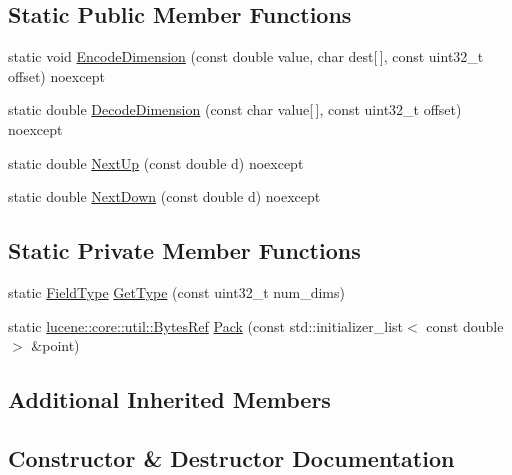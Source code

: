 \subsection*{Static Public Member Functions}
\begin{DoxyCompactItemize}
\item 
static void \mbox{\hyperlink{classlucene_1_1core_1_1document_1_1DoublePoint_a633e37e3ec07561f1af51e0215069cc5}{Encode\+Dimension}} (const double value, char dest\mbox{[}$\,$\mbox{]}, const uint32\+\_\+t offset) noexcept
\item 
static double \mbox{\hyperlink{classlucene_1_1core_1_1document_1_1DoublePoint_abffe80eb3bb0bf46daceaff952a669b9}{Decode\+Dimension}} (const char value\mbox{[}$\,$\mbox{]}, const uint32\+\_\+t offset) noexcept
\item 
static double \mbox{\hyperlink{classlucene_1_1core_1_1document_1_1DoublePoint_a1528aa543245510f6643c7432fcf3a9a}{Next\+Up}} (const double d) noexcept
\item 
static double \mbox{\hyperlink{classlucene_1_1core_1_1document_1_1DoublePoint_ad8b9a18e61d743166d762e2f82b2deb1}{Next\+Down}} (const double d) noexcept
\end{DoxyCompactItemize}
\subsection*{Static Private Member Functions}
\begin{DoxyCompactItemize}
\item 
static \mbox{\hyperlink{classlucene_1_1core_1_1document_1_1FieldType}{Field\+Type}} \mbox{\hyperlink{classlucene_1_1core_1_1document_1_1DoublePoint_ae6d734636e6e1c80f0ffd28443e62c08}{Get\+Type}} (const uint32\+\_\+t num\+\_\+dims)
\item 
static \mbox{\hyperlink{classlucene_1_1core_1_1util_1_1BytesRef}{lucene\+::core\+::util\+::\+Bytes\+Ref}} \mbox{\hyperlink{classlucene_1_1core_1_1document_1_1DoublePoint_a9ad090bc4fec578601b40f974302f60f}{Pack}} (const std\+::initializer\+\_\+list$<$ const double $>$ \&point)
\end{DoxyCompactItemize}
\subsection*{Additional Inherited Members}


\subsection{Constructor \& Destructor Documentation}
\mbox{\label{classlucene_1_1core_1_1document_1_1DoublePoint_af18300dfcbaa7b925acef0e6e8a3c103}} 
